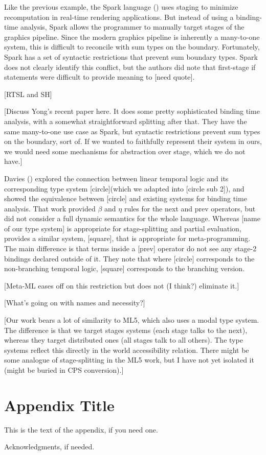 \documentclass{sigplanconf}
\begin{document}
Like the previous example, the Spark language (\cite{sparkThesis}) uses staging to minimize recomputation in real-time rendering applications.  But instead of using a binding-time analysis, Spark allows the programmer to manually target stages of the graphics pipeline.  Since the modern graphics pipeline is inherently a many-to-one system, this is difficult to reconcile with sum types on the boundary.  Fortunately, Spark has a set of syntactic restrictions that prevent sum boundary types.  Spark does not clearly identify this conflict, but the authors did note that first-stage if statements were difficult to provide meaning to [need quote].

[RTSL and SH]

[Discuss Yong's recent paper here.  It does some pretty sophisticated binding time analysis, with a somewhat straightforward splitting after that.  They have the same many-to-one use case as Spark, but syntactic restrictions prevent sum types on the boundary, sort of.  If we wanted to faithfully represent their system in ours, we would need some mechanisms for abstraction over stage, which we do not have.]

Davies (\cite{davies96}) explored the connection between linear temporal logic and its corresponding type system [circle](which we adapted into [circle sub 2]), and showed the equivalence between [circle] and existing systems for binding time analysis. That work provided $\beta$ and $\eta$ rules for the next and prev operators, but did not consider a full dynamic semantics for the whole language. Whereas [name of our type system] is appropriate for stage-splitting and partial evaluation, \cite{davies01} provides a similar system, [square], that is appropriate for meta-programming.  The main difference is that terms inside a [prev] operator do not see any stage-2 bindings declared outside of it.  They note that where [circle] corresponds to the non-branching temporal logic, [square] corresponds to the branching version.

[Meta-ML eases off on this restriction but does not (I think?) eliminate it.]

[What's going on with names and necessity?]

[Our work bears a lot of similarity to ML5, which also uses a modal type system.  The difference is that we target stages systems (each stage talks to the next), whereas they target distributed ones (all stages talk to all others). The type systems reflect this directly in the world accessibility relation.  There might be some analogue of stage-splitting in the ML5 work, but I have not yet isolated it (might be buried in CPS conversion).]

\appendix
\section{Appendix Title}

This is the text of the appendix, if you need one.

\acks

Acknowledgments, if needed.




\end{document}
